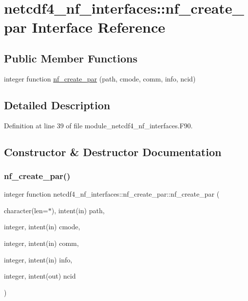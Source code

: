 \hypertarget{interfacenetcdf4__nf__interfaces_1_1nf__create__par}{}\section{netcdf4\+\_\+nf\+\_\+interfaces\+:\+:nf\+\_\+create\+\_\+par Interface Reference}
\label{interfacenetcdf4__nf__interfaces_1_1nf__create__par}
\subsection*{Public Member Functions}
\begin{DoxyCompactItemize}
\item 
integer function \hyperlink{interfacenetcdf4__nf__interfaces_1_1nf__create__par_ace1f361aa2fe3e7c4fabf61079be49fe}{nf\+\_\+create\+\_\+par} (path, cmode, comm, info, ncid)
\end{DoxyCompactItemize}


\subsection{Detailed Description}


Definition at line 39 of file module\+\_\+netcdf4\+\_\+nf\+\_\+interfaces.\+F90.



\subsection{Constructor \& Destructor Documentation}
\mbox{\label{interfacenetcdf4__nf__interfaces_1_1nf__create__par_ace1f361aa2fe3e7c4fabf61079be49fe}} 
\subsubsection{\texorpdfstring{nf\+\_\+create\+\_\+par()}{nf\_create\_par()}}
{\footnotesize\ttfamily integer function netcdf4\+\_\+nf\+\_\+interfaces\+::nf\+\_\+create\+\_\+par\+::nf\+\_\+create\+\_\+par (\begin{DoxyParamCaption}\item[{character(len=$\ast$), intent(in)}]{path,  }\item[{integer, intent(in)}]{cmode,  }\item[{integer, intent(in)}]{comm,  }\item[{integer, intent(in)}]{info,  }\item[{integer, intent(out)}]{ncid }\end{DoxyParamCaption})}



